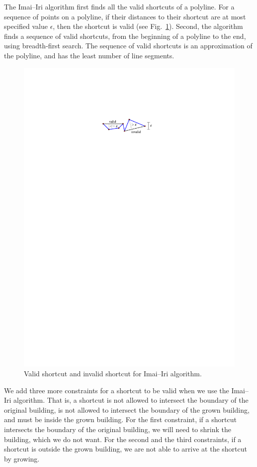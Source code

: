 \documentclass[graybox]{svmult}
\newcommand{\fig}{Fig.~}
\begin{document}
The Imai--Iri algorithm first finds all the valid shortcuts of a polyline.
For a sequence of points on a polyline, 
if their distances to their shortcut are 
at most specified value $\epsilon$, then the shortcut is valid (see 
\fig\ref{fig:ImaiIri_Shortcut}). 
Second, the algorithm finds a sequence of valid shortcuts, from the beginning 
of a polyline to the end, using breadth-first search.
The sequence of valid shortcuts is an approximation of the polyline, 
and has the least number of line segments.

\begin{figure}[tb]
	\centering
	\includegraphics{ImaiIri_Shortcut}
	\caption{Valid shortcut and invalid shortcut for Imai--Iri algorithm.}
	\label{fig:ImaiIri_Shortcut}
\end{figure}

We add three more constraints for a shortcut to be valid
when we use the Imai--Iri algorithm. 
That is, 
a shortcut is not allowed to intersect the boundary of the original building, 
is not allowed to intersect the boundary of the grown building, 
and must be inside the grown building.
For the first constraint, 
if a shortcut intersects the boundary of the original building, 
we will need to shrink the building, which we do not want.
For the second and the third constraints,
if a shortcut is outside the grown building,
we are not able to arrive at the shortcut by growing.
\end{document}

